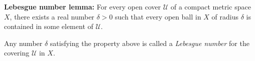 \documentclass[12pt]{article}
\begin{document}
{\bf Lebesgue number lemma:} For every open cover $\mathcal{U}$ of a compact metric space $X$, there exists a real number $\delta > 0$ such that every open ball in $X$ of radius $\delta$ is contained in some element of $\mathcal{U}$.

Any number $\delta$ satisfying the property above is called a {\em Lebesgue number} for the covering $\mathcal{U}$ in $X$.
\end{document}
